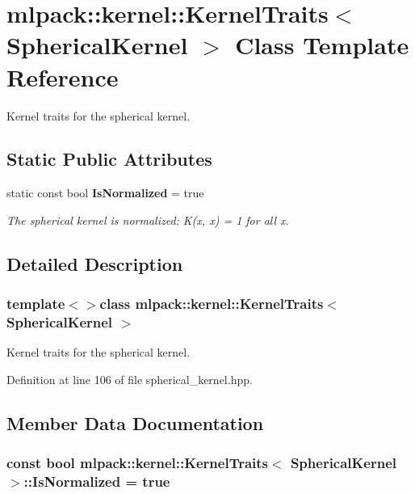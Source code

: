 \section{mlpack\-:\-:kernel\-:\-:Kernel\-Traits$<$ Spherical\-Kernel $>$ Class Template Reference}
\label{classmlpack_1_1kernel_1_1KernelTraits_3_01SphericalKernel_01_4}


Kernel traits for the spherical kernel.  


\subsection*{Static Public Attributes}
\begin{DoxyCompactItemize}
\item 
static const bool {\bf Is\-Normalized} = true
\begin{DoxyCompactList}\small\item\em The spherical kernel is normalized\-: K(x, x) = 1 for all x. \end{DoxyCompactList}\end{DoxyCompactItemize}


\subsection{Detailed Description}
\subsubsection*{template$<$$>$class mlpack\-::kernel\-::\-Kernel\-Traits$<$ Spherical\-Kernel $>$}

Kernel traits for the spherical kernel. 

Definition at line 106 of file spherical\-\_\-kernel.\-hpp.



\subsection{Member Data Documentation}
\subsubsection[{Is\-Normalized}]{\setlength{\rightskip}{0pt plus 5cm}const bool {\bf mlpack\-::kernel\-::\-Kernel\-Traits}$<$ {\bf Spherical\-Kernel} $>$\-::Is\-Normalized = true\hspace{0.3cm}{\ttfamily [static]}}\label{classmlpack_1_1kernel_1_1KernelTraits_3_01SphericalKernel_01_4_a507f43d3a9dc1ac91353e71ed292a904}


